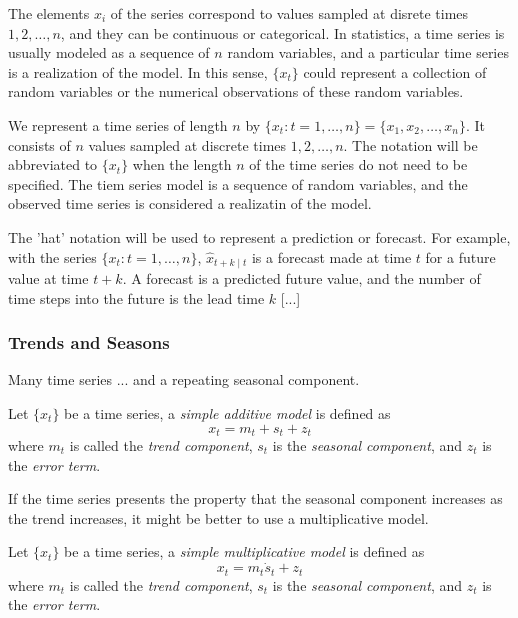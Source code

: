 The elements $x_i$ of the series correspond to values sampled at disrete times $1, 2, \ldots, n$, and they can be continuous or categorical. In statistics, a time series is usually modeled as a sequence of $n$ random variables, and a particular time series is a realization of the model. In this sense, $\{ x_t \}$ could represent a collection of random variables or the numerical observations of these random variables.

{\color{red} We represent a time series of length $n$ by $\{ x_t : t=1,\ldots,n \} = \{x_1, x_2, \ldots, x_n \}$. It consists of $n$ values sampled at discrete times $1, 2, \ldots, n$. The notation will be abbreviated to $\{x_t\}$ when the length $n$ of the time series do not need to be specified. The tiem series model is a sequence of random variables, and the observed time series is considered a realizatin of the model.
}

{\color{red} The 'hat' notation will be used to represent a prediction or forecast. For example, with the series $\{ x_t : t=1,\ldots,n \}$, $\hat{x}_{t+k \mid t}$ is a forecast made at time $t$ for a future value at time $t+k$. A forecast is a predicted future value, and the number of time steps into the future is the lead time $k$ [...]
}

\subsubsection{Trends and Seasons}

Many time series ... and a repeating seasonal component.

\begin{definition}
    Let $\{ x_t \}$ be a time series, a \emph{simple additive model} is defined as
    \[
        x_t = m_t + s_t + z_t
    \]
    where $m_t$ is called the \emph{trend component}, $s_t$ is the \emph{seasonal component}, and $z_t$ is the \emph{error term}.
\end{definition}

If the time series presents the property that the seasonal component increases as the trend increases, it might be better to use a multiplicative model.

\begin{definition}
    Let $\{ x_t \}$ be a time series, a \emph{simple multiplicative model} is defined as
    \[
        x_t = m_t \dot s_t + z_t
    \]
    where $m_t$ is called the \emph{trend component}, $s_t$ is the \emph{seasonal component}, and $z_t$ is the \emph{error term}.
\end{definition}

